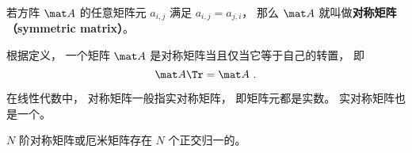 
\begin{issues}
\issueDraft
{}
\end{issues}


\begin{definition}{}
若方阵 $\mat A$ 的任意矩阵元 $a_{i,j}$ 满足 $a_{i,j} = a_{j,i}$， 那么 $\mat A$ 就叫做\textbf{对称矩阵（symmetric matrix）}。
\end{definition}

根据定义， 一个矩阵 $\mat A$ 是对称矩阵当且仅当它等于自己的转置， 即
\begin{equation}
\mat A\Tr = \mat A~.
\end{equation}

在线性代数中， 对称矩阵一般指实对称矩阵， 即矩阵元都是实数。 实对称矩阵也是一个。

$N$ 阶对称矩阵或厄米矩阵存在 $N$ 个正交归一的。
